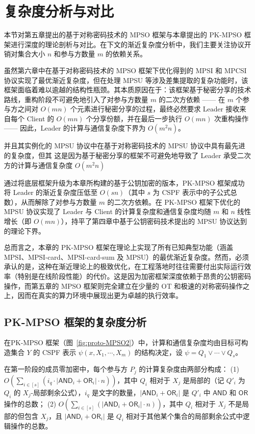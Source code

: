 \section{复杂度分析与对比}

本节对第五章提出的基于对称密码技术的 MPSO 框架与本章提出的 PK-MPSO 框架进行深度的理论剖析与对比。在下文的渐近复杂度分析中，我们主要关注协议开销对集合大小 $n$ 和参与方数量 $m$ 的依赖关系。

虽然第六章中在基于对称密码技术的 MPSO 框架下优化得到的 MPSI 和 MPCSI 协议实现了最优渐近复杂度，但在处理 MPSU 等涉及差集提取的复杂功能时，该框架面临着难以逾越的结构性瓶颈。其本质原因在于：该框架基于秘密分享的技术路线，重构阶段不可避免地引入了对参与方数量 $m$ 的二次方依赖 —— 在 $m$ 个参与方之间对 $O(mn)$ 个元素进行秘密分享的过程，最终必然要求 Leader 接收来自每个 Client 的 $O(mn)$ 个分享份额，并在最后一步执行 $O(mn)$ 次重构操作 —— 因此，Leader 的计算与通信复杂度下界为 $O(m^2 n)$。

 并且其实例化的 MPSU 协议中在基于对称密码技术的 MPSU 协议中具有最先进的复杂度，但其 这是因为基于秘密分享的框架不可避免地导致了 Leader 承受二次方的计算与通信复杂度 $O(m^2 n)$ 

通过将底层框架升级为本章所构建的基于公钥加密的版本，PK-MPSO 框架成功将 Leader 的渐近复杂度压低至 $O(sn)$（其中 $s$ 为 CSPF 表示中的子公式总数），从而解除了对参与方数量 $m$ 的二次方依赖。在 PK-MPSO 框架下优化的 MPSU 协议实现了 Leader 与 Client 的计算复杂度和通信复杂度均随 $m$ 和 $n$ 线性增长（即 $O(mn)$），持平了第四章中基于公钥密码技术提出的 MPSU 协议达到的理论下界。

总而言之，本章的 PK-MPSO 框架在理论上实现了所有已知典型功能（涵盖 MPSI、MPSI-card、MPSI-card-sum 及 MPSU）的最优渐近复杂度。然而，必须承认的是，这种在渐近理论上的极致优化，在工程落地时往往需要付出实际运行效率（特别是在线阶段性能）的代价。这是因为加密框架深度依赖于昂贵的公钥密码操作，而第五章的 MPSO 框架则完全建立在少量的 OT 和极速的对称密码操作之上，因而在真实的算力环境中展现出更为卓越的执行效率。

\subsection{PK-MPSO 框架的复杂度分析}

在PK-MPSO 框架（图~\ref{fig:proto-MPSO2}）中，计算和通信复杂度均由目标可构造集合 $Y$ 的 CSPF 表示 $\psi(x, X_1, \cdots, X_m)$ 的结构决定，设 $\psi = Q_1 \lor \cdots \lor Q_s$。

在第一阶段的成员零加密中，每个参与方 $P_j$ 的计算复杂度由两部分构成：
(1) $O(\sum_{i \in [s]}(i_q \cdot \lvert \mathsf{AND}_i + \mathsf{OR}_i \rvert \cdot n))$，其中 $Q_i$ 相对于 $X_j$ 是局部的（记 $Q'_i$ 为 $Q_i$ 的 $X_j$-局部剩余公式），$i_q$ 是文字的数量，$\lvert \mathsf{AND}_i + \mathsf{OR}_i \rvert$ 是 $Q'_i$ 中 $\mathsf{AND}$ 和 $\mathsf{OR}$ 操作的总数；
(2) $O(\sum_{i \in [s]}(\lvert \mathsf{AND}_i + \mathsf{OR}_i \rvert \cdot n))$，其中 $Q_i$ 相对于 $X_j$ 不是局部的但包含 $X_j$，且 $\lvert \mathsf{AND}_i + \mathsf{OR}_i \rvert$ 是 $Q_i$ 相对于其他某个集合的局部剩余公式中逻辑操作的总数。

